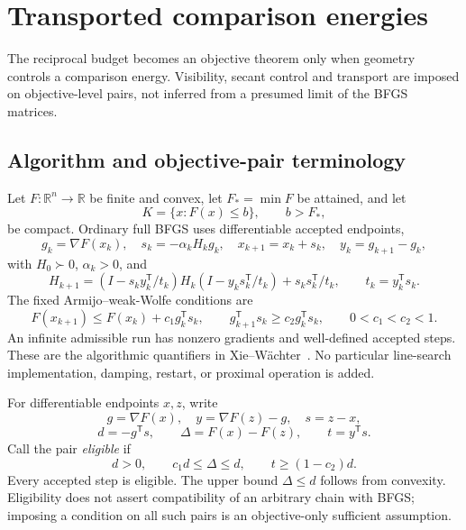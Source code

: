 \chapter{Transported comparison energies}\label{comp:T}\label{T:chapter}
\renewcommand{\ModuleTag}{3}
The reciprocal budget becomes an objective theorem only when geometry controls a comparison energy. Visibility, secant control and transport are imposed on objective-level pairs, not inferred from a presumed limit of the BFGS matrices.


\begingroup
\providecommand{\R}{}
\renewcommand{\R}{\mathbb R}
\providecommand{\tr}{}
\renewcommand{\tr}{\operatorname{tr}}
\providecommand{\diag}{}
\renewcommand{\diag}{\operatorname{diag}}
\providecommand{\Span}{}
\renewcommand{\Span}{\operatorname{span}}
\providecommand{\ip}{}
\renewcommand{\ip}[2]{\langle #1,#2\rangle}
\providecommand{\norm}{}
\renewcommand{\norm}[1]{\lVert #1\rVert}
\providecommand{\T}{}
\renewcommand{\T}{^{\mathsf T}}
\providecommand{\D}{}
\renewcommand{\D}{\mathcal D}
\setcounter{section}{1}
\setcounter{theorem}{0}
\setcounter{lemma}{0}
\setcounter{corollary}{0}
\setcounter{proposition}{0}
\setcounter{remark}{0}
\setcounter{equation}{2}


\section{Algorithm and objective-pair terminology}
Let $F:\R^n\to\R$ be finite and convex, let $F_*=\min F$ be attained, and let
\[
 K=\{x:F(x)\le b\},\qquad b>F_*,
\]
be compact. Ordinary full BFGS uses differentiable accepted endpoints,
\[
 g_k=\nabla F(x_k),\quad s_k=-\alpha_kH_kg_k,\quad
 x_{k+1}=x_k+s_k,\quad y_k=g_{k+1}-g_k,
\]
with $H_0\succ0$, $\alpha_k>0$, and
\[
 H_{k+1}=(I-s_ky_k\T/t_k)H_k(I-y_ks_k\T/t_k)+s_ks_k\T/t_k,
 \qquad t_k=y_k\T s_k.
\]
The fixed Armijo--weak-Wolfe conditions are
\[
 F(x_{k+1})\le F(x_k)+c_1g_k\T s_k,\qquad
 g_{k+1}\T s_k\ge c_2g_k\T s_k,\qquad 0<c_1<c_2<1.
\]
An infinite admissible run has nonzero gradients and well-defined accepted steps. These are the algorithmic quantifiers in Xie--W\"achter~\cite{XW}. No particular line-search implementation, damping, restart, or proximal operation is added.

For differentiable endpoints $x,z$, write
\[
 g=\nabla F(x),\quad y=\nabla F(z)-g,\quad s=z-x,
\]
\[
 d=-g\T s,\qquad \Delta=F(x)-F(z),\qquad t=y\T s.
\]
Call the pair \emph{eligible} if
\begin{equation}
 d>0,\qquad c_1d\le\Delta\le d,\qquad t\ge(1-c_2)d. \tag{3.2}
\end{equation}
Every accepted step is eligible. The upper bound $\Delta\le d$ follows from convexity. Eligibility does not assert compatibility of an arbitrary chain with BFGS; imposing a condition on all such pairs is an objective-only sufficient assumption.

